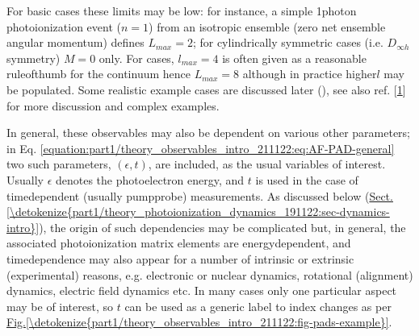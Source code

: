 \documentclass[letterpaper,table,10pt,english]{jupyterBook}
\begin{document}
\sphinxAtStartPar
For basic cases these limits may be low: for instance, a simple 1\sphinxhyphen{}photon photoionization event (\(n=1\)) from an isotropic ensemble (zero net ensemble angular momentum) defines \(L_{max}=2\); for cylindrically symmetric cases (i.e. \(D_{\infty h}\) symmetry) \(M=0\) only. For {\hyperref[\detokenize{backmatter/glossary:term-MF}]{}} cases, \(l_{max}=4\) is often given as a reasonable rule\sphinxhyphen{}of\sphinxhyphen{}thumb for the continuum \sphinxhyphen{} hence \(L_{max}=8\) \sphinxhyphen{} although in practice higher\sphinxhyphen{}\(l\) may be populated. Some realistic example cases are discussed later (), see also ref. {[}\hyperlink{cite.backmatter/bibliography:id613}{1}{]} for more discussion and complex examples.

\sphinxAtStartPar
In general, these observables may also be dependent on various other parameters; in Eq. \eqref{equation:part1/theory_observables_intro_211122:eq:AF-PAD-general} two such parameters, \((\epsilon,t)\), are included, as the usual variables of interest. Usually \(\epsilon\) denotes the photoelectron energy, and \(t\) is used in the case of time\sphinxhyphen{}dependent (usually pump\sphinxhyphen{}probe) measurements. As discussed below (\hyperref[\detokenize{part1/theory_photoionization_dynamics_191122:sec-dynamics-intro}]{Sect.\@ \ref{\detokenize{part1/theory_photoionization_dynamics_191122:sec-dynamics-intro}}}), the origin of such dependencies may be complicated but, in general, the associated photoionization matrix elements are energy\sphinxhyphen{}dependent, and time\sphinxhyphen{}dependence may also appear for a number of intrinsic or extrinsic (experimental) reasons, e.g. electronic or nuclear dynamics, rotational (alignment) dynamics, electric field dynamics etc. In many cases only one particular aspect may be of interest, so \(t\) can be used as a generic label to index changes as per \hyperref[\detokenize{part1/theory_observables_intro_211122:fig-pads-example}]{Fig.\@ \ref{\detokenize{part1/theory_observables_intro_211122:fig-pads-example}}}.
\end{document}

